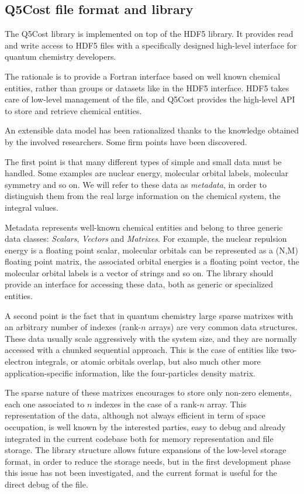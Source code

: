\subsection*{Q5Cost file format and library} 

The Q5Cost library is implemented on top of the HDF5 library.  It provides
read and write access to HDF5 files with a specifically designed high-level
interface for quantum chemistry developers. 

The rationale is to provide a Fortran interface based on well known chemical
entities, rather
than groups or datasets like in the HDF5 interface. HDF5 takes care of
low-level management of the file, and Q5Cost provides the high-level
API to store and retrieve chemical entities.

An extensible data model has been rationalized thanks to the knowledge
obtained by the involved researchers. Some firm points have been
discovered.

The first point is that many different types of simple and small data
must be handled. Some examples are nuclear energy, molecular orbital labels,
molecular symmetry and so on. We will refer to these data as
\textit{metadata}, in order to distinguish them from the real large
information on the chemical system, the integral values.

Metadata represents well-known chemical entities and belong to three
generic data classes: \textit{Scalars}, \textit{Vectors} and
\textit{Matrixes}. For example, the nuclear repulsion energy is a floating
point scalar, molecular orbitals can be represented as a (N,M) floating point matrix, the
associated orbital energies is a floating point vector, the molecular
orbital labels is a vector of strings and so on. The library should provide
an interface for accessing these data, both as generic or specialized
entities.

A second point is the fact that in quantum chemistry large sparse
matrixes with an arbitrary number of indexes (rank-$n$ arrays) are very
common data structures. These data usually scale aggressively with the
system size, and they are normally accessed with a chunked sequential approach.
This is the case of entities like two-electron integrals, or atomic
orbitals overlap, but also much other more application-specific
information, like the four-particles density matrix.

The sparse nature of these matrixes encourages to store only non-zero
elements, each one associated to $n$ indexes in the case of a rank-$n$
array. This representation of the data, although not always efficient in
term of space occupation, is well known by the interested parties, easy to
debug and already integrated in the current codebase both for memory
representation and file storage. The library structure allows 
future expansions of the low-level storage format, in order to reduce the
storage needs, but in the first development phase this issue has not
been investigated, and the current format is useful for the direct debug of
the file.

